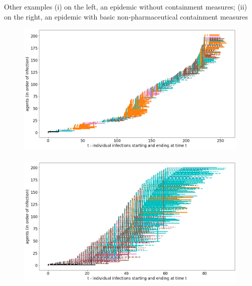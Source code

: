 \documentclass[8pt]{beamer}
\begin{document}
\begin{frame}{Other examples (i) on the left, an epidemic without containment measures; (ii) on the right, an epidemic with basic non-pharmaceutical containment measures}

\begin{figure}[H]
\center
\includegraphics[scale=0.12]{no4b.png}~~~~~~~~~~~\includegraphics[scale=0.12]{with7b.png} 


\end{figure}
\end{frame}
\end{document}
